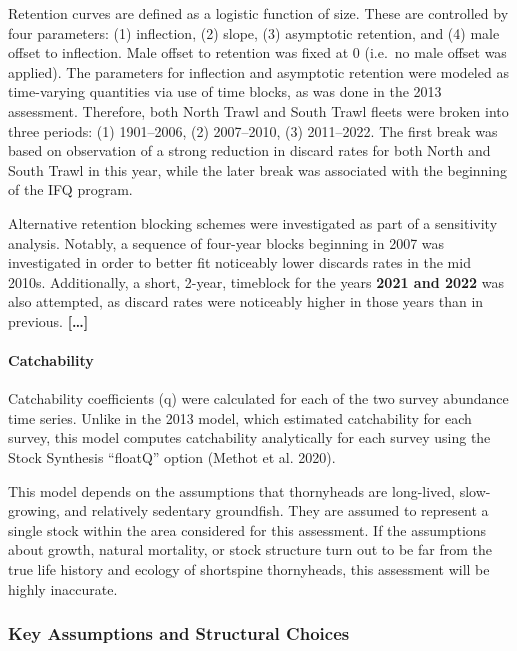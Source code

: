 \documentclass[11pt,
  english,
  letterpaper,
]{article}
\begin{document}
Retention curves are defined as a logistic function of size. These are controlled by four parameters: (1) inflection, (2) slope, (3) asymptotic retention, and (4) male offset to inflection. Male offset to retention was fixed at 0 (i.e.~no male offset was applied). The parameters for inflection and asymptotic retention were modeled as time-varying quantities via use of time blocks, as was done in the 2013 assessment. Therefore, both North Trawl and South Trawl fleets were broken into three periods: (1) 1901--2006, (2) 2007--2010, (3) 2011--2022. The first break was based on observation of a strong reduction in discard rates for both North and South Trawl in this year, while the later break was associated with the beginning of the IFQ program.

Alternative retention blocking schemes were investigated as part of a sensitivity analysis. Notably, a sequence of four-year blocks beginning in 2007 was investigated in order to better fit noticeably lower discards rates in the mid 2010s. Additionally, a short, 2-year, timeblock for the years \textbf{2021 and 2022} was also attempted, as discard rates were noticeably higher in those years than in previous. \textbf{{[}\ldots{]}}

\hypertarget{catchability}{%
\paragraph{Catchability}\label{catchability}}

Catchability coefficients (q) were calculated for each of the two survey abundance time series. Unlike in the 2013 model, which estimated catchability for each survey, this model computes catchability analytically for each survey using the Stock Synthesis ``floatQ'' option (Methot et al. 2020).

This model depends on the assumptions that thornyheads are long-lived, slow-growing, and relatively sedentary groundfish. They are assumed to represent a single stock within the area considered for this assessment. If the assumptions about growth, natural mortality, or stock structure turn out to be far from the true life history and ecology of shortspine thornyheads, this assessment will be highly inaccurate.

\hypertarget{key-assumptions-and-structural-choices}{%
\subsubsection{Key Assumptions and Structural Choices}\label{key-assumptions-and-structural-choices}}
\end{document}
